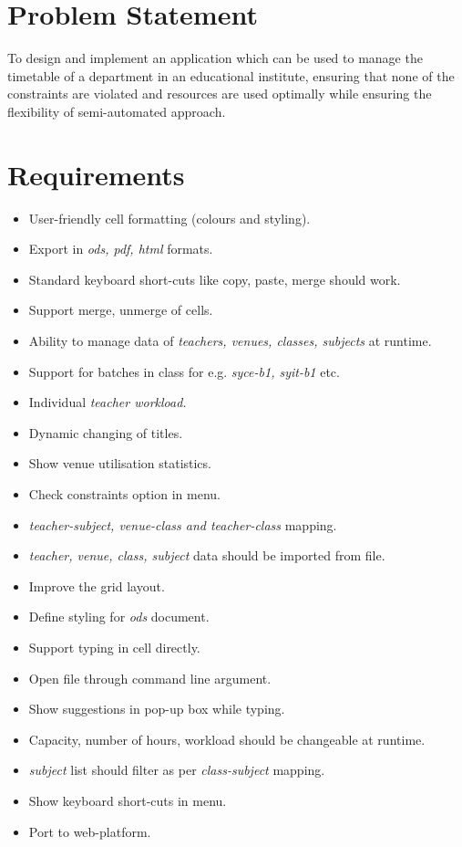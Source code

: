 			
\section{Problem Statement}

To design and implement an application which can be used to manage the timetable of a department in an educational institute, ensuring that none of the constraints are violated and resources are used optimally while ensuring the flexibility of semi-automated approach.


\section{Requirements}
\begin{itemize}
\item User-friendly cell formatting (colours and styling).
\item Export in \textit{ods, pdf, html} formats.
\item Standard keyboard short-cuts like copy, paste, merge should work.
\item Support merge, unmerge of cells.
\item Ability to manage data of \textit{teachers, venues, classes, subjects} at runtime.
\item Support for batches in class for e.g. \textit{syce-b1, syit-b1} etc.
\item Individual \textit{teacher workload.}
\item Dynamic changing of titles.
\item Show venue utilisation statistics.
\item Check constraints option in menu.
\item \textit{teacher-subject, venue-class and teacher-class} mapping.
\item \textit{teacher, venue, class, subject} data should be imported from file.
\item Improve the grid layout.
\item Define styling for \textit{ods} document.
\item Support typing in cell directly.
\item Open file through command line argument.
\item Show suggestions in pop-up box while typing.
\item Capacity, number of hours, workload should be changeable at runtime.
\item \textit{subject} list should filter as per \textit{class-subject} mapping.
\item Show keyboard short-cuts in menu.
\item Port to web-platform.
\end{itemize}

